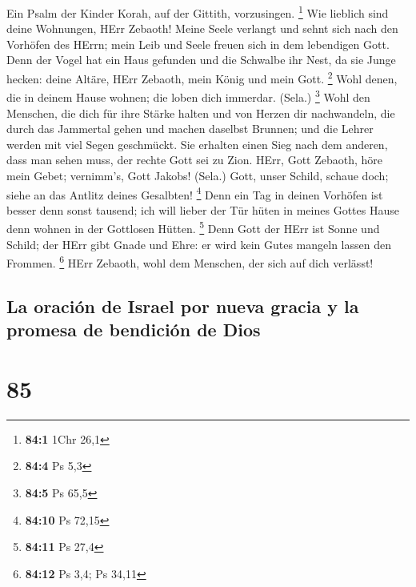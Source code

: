  Ein Psalm der Kinder Korah, auf der Gittith, vorzusingen.
\footnote{\textbf{84:1} 1Chr 26,1}  Wie lieblich sind
deine Wohnungen, HErr Zebaoth!  Meine Seele verlangt und
sehnt sich nach den Vorhöfen des HErrn; mein Leib und Seele freuen sich
in dem lebendigen Gott.  Denn der Vogel hat ein Haus
gefunden und die Schwalbe ihr Nest, da sie Junge hecken: deine Altäre,
HErr Zebaoth, mein König und mein Gott. \footnote{\textbf{84:4} Ps 5,3}
 Wohl denen, die in deinem Hause wohnen; die loben dich
immerdar. (Sela.) \footnote{\textbf{84:5} Ps 65,5}  Wohl
den Menschen, die dich für ihre Stärke halten und von Herzen dir
nachwandeln,  die durch das Jammertal gehen und machen
daselbst Brunnen; und die Lehrer werden mit viel Segen geschmückt.
 Sie erhalten einen Sieg nach dem anderen, dass man sehen
muss, der rechte Gott sei zu Zion.  HErr, Gott Zebaoth,
höre mein Gebet; vernimm's, Gott Jakobs! (Sela.)  Gott,
unser Schild, schaue doch; siehe an das Antlitz deines Gesalbten!
\footnote{\textbf{84:10} Ps 72,15}  Denn ein Tag in
deinen Vorhöfen ist besser denn sonst tausend; ich will lieber der Tür
hüten in meines Gottes Hause denn wohnen in der Gottlosen Hütten.
\footnote{\textbf{84:11} Ps 27,4}  Denn Gott der HErr ist
Sonne und Schild; der HErr gibt Gnade und Ehre: er wird kein Gutes
mangeln lassen den Frommen. \footnote{\textbf{84:12} Ps 3,4; Ps 34,11}
 HErr Zebaoth, wohl dem Menschen, der sich auf dich
verlässt!

\hypertarget{la-oraciuxf3n-de-israel-por-nueva-gracia-y-la-promesa-de-bendiciuxf3n-de-dios}{%
\subsection{La oración de Israel por nueva gracia y la promesa de
bendición de
Dios}\label{la-oraciuxf3n-de-israel-por-nueva-gracia-y-la-promesa-de-bendiciuxf3n-de-dios}}

\hypertarget{section-84}{%
\section{85}\label{section-84}}

